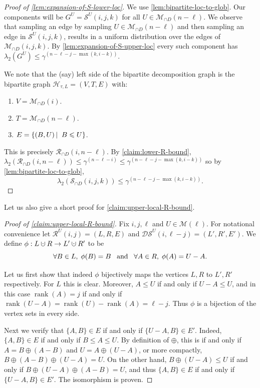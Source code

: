 \documentclass[10pt,a4paper]{article}
\newcommand{\prettyref}[1]{\cref{#1}}
\theoremstyle{definition}
\theoremstyle{remark}
\newcommand\sett[2]{\left\{ #1 \left| \; \vphantom{#1 #2} \right. #2  \right\}}
\newcommand{\set}[1]{\{#1\}}
\newcommand{\ve}{\;\hbox{and}\;}
\DeclareMathOperator{\rank}{rank}
\renewcommand{\leq}{\leqslant}
\numberwithin{equation}{section}
\newcommand{\dunion}{\mathbin{\mathaccent\cdot\cup}}
\let\pref=\prettyref
\def\B{\mathcal{H}}
\def\MP{\mathcal{M}}
\begin{document}
\begin{proof}[Proof of \pref{lem:expansion-of-S-lower-loc}]
We use \pref{lem:bipartite-loc-to-glob}. Our components will be \(G^U = \mathcal{S}^U(i,j,k)\) for all \(U \in \MP_{\cap D}(n-\ell)\). We observe that sampling an edge by sampling \(U \in \MP_{\cap D}(n-\ell)\) and then sampling an edge in \(\mathcal{S}^U(i,j,k)\), results in a uniform distribution over the edges of \(\MP_{\cap D}(i,j,k)\). By \pref{lem:expansion-of-S-upper-loc} every such component has \(\lambda_2(G^U) \leq \gamma^{(n-\ell-j-\max(k,i-k))}\).

We note that the (say) left side of the bipartite decomposition graph is the bipartite graph \(\B_{\tau,L}=(V,T,E)\) with:
\begin{enumerate}
    \item \(V = \MP_{\cap D}(i)\).
    \item \(T = \MP_{\cap D}(n-\ell)\).
    \item \(E = \sett{(B,U)}{B \leq U}\).
\end{enumerate}
This is precisely \(\mathcal{R}_{\cap D}(i,n-\ell)\). By \pref{claim:lower-R-bound}, \(\lambda_2(\mathcal{R}_{\cap D}(i,n-\ell)) \leq \gamma^{(n-\ell-i)}\leq \gamma^{(n-\ell-j-\max(k,i-k))}\) so by \pref{lem:bipartite-loc-to-glob},
\[\lambda_2(\mathcal{S}_{\cap D}(i,j,k)) \leq \gamma^{(n-\ell-j-\max(k,i-k))}.\]
\end{proof}

Let us also give a short proof for \pref{claim:upper-local-R-bound}.
\begin{proof}[Proof of \pref{claim:upper-local-R-bound}]
    Fix \(i,j,\ell\) and \(U \in \MP(\ell)\). For notational convenience let \(\mathcal{R}^U(i,j) = (L,R,E)\) and \(\mathcal{DS}^U(i,\ell-j) = (L',R',E')\). We define 
    \(\phi:L \dunion R \to L' \dunion R'\) to be
    \[\forall B \in L, \; \phi(B) = B \; \; \ve \; \; \forall A \in R, \; \phi(A) = U-A.\]
    
    Let us first show that indeed \(\phi\) bijectively maps the vertices \(L,R\) to \(L',R'\) respectively. For \(L\) this is clear. Moreover, \(A \leq U\) if and only if \(U-A \leq U\), and in this case \(\rank(A) = j\) if and only if \(\rank(U-A) = \rank(U)-\rank(A)=\ell-j\). Thus \(\phi\) is a bijection of the vertex sets in every side.

    Next we verify that \(\set{A,B} \in E\) if and only if \(\set{U-A,B} \in E'\). Indeed, \(\set{A,B}\in E\) if and only if \(B \leq A \leq U\). By definition of \(\oplus\), this is if and only if \(A=B \oplus (A-B)\) and \(U=A \oplus (U-A)\), or more compactly, \(B \oplus (A-B) \oplus (U-A) = U\). On the other hand, \(B \oplus (U-A) \leq U\) if and only if \(B \oplus (U-A) \oplus (A-B) = U\), and thus \(\set{A,B} \in E\) if and only if \(\set{U-A,B} \in E'\). The isomorphism is proven.
\end{proof}
\end{document}
